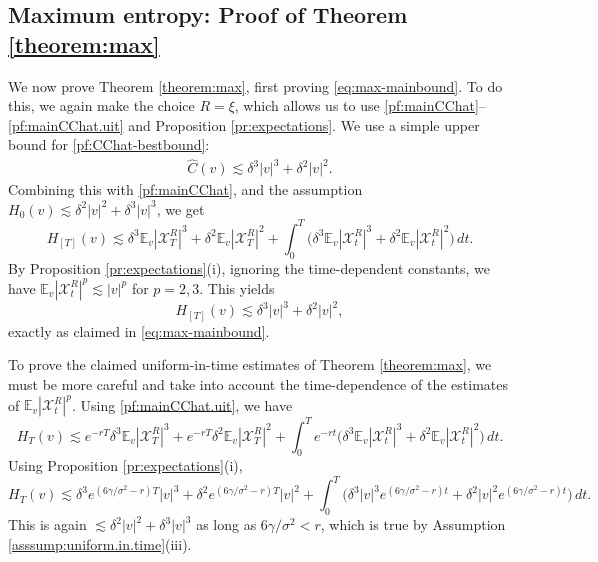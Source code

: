 \documentclass[11pt,reqno]{amsart}
\numberwithin{equation}{section}
\theoremstyle{definition}
\def\CC{{C}}
\def\E{{\mathbb E}}
\def\X{{\mathcal X}}
\begin{document}
\subsection{Maximum entropy: Proof of Theorem \ref{theorem:max}}

We now prove Theorem \ref{theorem:max}, first proving \eqref{eq:max-mainbound}. To do this, we again make the choice $R = \xi$, which  allows us to use \eqref{pf:mainCChat}--\eqref{pf:mainCChat.uit} and Proposition  \ref{pr:expectations}. We use a simple upper bound for \eqref{pf:CChat-bestbound}:
\begin{align} \label{eq:C.in.max.case}
\widehat{\CC}(v) \lesssim \delta^3|v|^3 + \delta^2|v|^2.
\end{align}
Combining this with \eqref{pf:mainCChat}, and the assumption $H_0(v) \lesssim \delta^2|v|^2+\delta^3|v|^3$, we get
\begin{equation*}
H_{[T]}(v) \lesssim \delta^3\E_v|\X_T^{R}|^3 + \delta^2\E_v|\X_T^{R}|^2 + \int_0^T \big(\delta^3\E_v|\X_t^{R}|^3 + \delta^2\E_v|\X_t^{R}|^2\big)\,dt.
\end{equation*}
By Proposition \ref{pr:expectations}(i), ignoring the time-dependent constants, we have $\E_v|\X_t^{R}|^p \lesssim |v|^p$ for $p=2,3$. This yields
\begin{equation*}
H_{[T]}(v) \lesssim \delta^3 |v|^3 + \delta^2|v|^2,
\end{equation*}
exactly as claimed in  \eqref{eq:max-mainbound}.

To prove the claimed uniform-in-time estimates of Theorem \ref{theorem:max}, we must be more careful and take into account the time-dependence of the estimates of $\E_v|\X_t^{R}|^p$. Using \eqref{pf:mainCChat.uit}, we have
\begin{equation*}
H_{T}(v) \lesssim e^{-rT}\delta^3\E_v|\X_T^{R}|^3 + e^{-rT}\delta^2\E_v|\X_T^{R}|^2 +  \int_0^T e^{-rt}\big(\delta^3\E_v|\X_t^{R}|^3 + \delta^2\E_v|\X_t^{R}|^2\big)\,dt.
\end{equation*}
Using Proposition \ref{pr:expectations}(i),
\begin{equation*}
H_{T}(v)  \lesssim \delta^3   e^{(6\gamma/\sigma^2-r)T}|v|^3   + \delta^2 e^{(6\gamma/\sigma^2-r)T}|v|^2 +   \int_0^T \big(\delta^3 |v|^3 e^{(6\gamma/\sigma^2-r)t} + \delta^2|v|^2e^{(6\gamma/\sigma^2-r)t} \big)\,dt.
\end{equation*}
This is again $\lesssim \delta^2|v|^2 + \delta^3 |v|^3$ as long as $6\gamma/\sigma^2 < r$, which is true by Assumption \ref{asssump:uniform.in.time}(iii).  \hfill \qedsymbol
\end{document}
